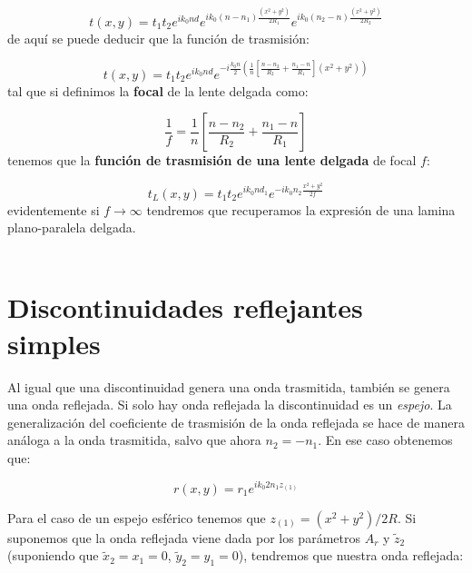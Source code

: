 \documentclass[12pt,a4paper]{book}
\numberwithin{equation}{section}
\numberwithin{figure}{section}
\newcommand{\parentesis}[1]{\left( #1  \right)}
\newcommand{\ccorchetes}[1]{\left[ #1  \right]}
\newcommand{\1}{_{(1)}}
\newcommand{\2}{_{(2)}}
\theoremstyle{definition}
\begin{document}
\begin{equation}
t(x,y) = t_1 t_2 e^{ik_0 n d} e^{i k_0 (n-n_1) \frac{(x^2+y^2)}{2R_1}} e^{ik_0(n_2-n) \frac{(x^2+y^2)}{2R_2}}
\end{equation}
de aquí se puede deducir que la función de trasmisión:

\begin{equation}
t(x,y) = t_1 t_2 e^{i k_0 n d} e^{-i \frac{k_0 n}{2} \parentesis{\frac{1}{n} \ccorchetes{\frac{n-n_2}{R_2} +\frac{n_1-n}{R_1}} (x^2+y^2)}}
\end{equation}
tal que si definimos la \textbf{focal} de la lente delgada como:

\begin{equation}
\dfrac{1}{f} = \dfrac{1}{n} \ccorchetes{\dfrac{n-n_2}{R_2} + \dfrac{n_1-n}{R_1}}
\end{equation}
tenemos que la \textbf{función de trasmisión de una lente delgada} de focal $f$:

\begin{equation}
t_L (x,y) = t_1 t_2 e^{i k_0 nd_1} e^{-ik_0n_2 \frac{x^2+y^2}{2f}}
\end{equation}
evidentemente si $f\rightarrow\infty$ tendremos que recuperamos la expresión de una lamina plano-paralela delgada.  \\

\hrulefill \\

\section{Discontinuidades reflejantes simples}

Al igual que una discontinuidad genera una onda trasmitida, también se genera una onda reflejada. Si solo hay onda reflejada la discontinuidad es un \textit{espejo}. La generalización del coeficiente de trasmisión de la onda reflejada se hace de manera análoga a la onda trasmitida, salvo que ahora $n_2 = - n_1$. En ese caso obtenemos que:

\begin{equation}
r(x,y) = r_1 e^{i k_0 2 n_1 z_{(1)}}
\end{equation}


\hrulefill

Para el caso de un espejo esférico tenemos que $z_{(1)} = (x^2+y^2)/2R$. Si suponemos que la onda reflejada viene dada por los parámetros $A_{r}$ y $\tilde{z}_2$ (suponiendo que $\tilde{x}_2 = x_1 = 0$, $\tilde{y}_2 = y_1 = 0$), tendremos que nuestra onda reflejada:
\end{document}
